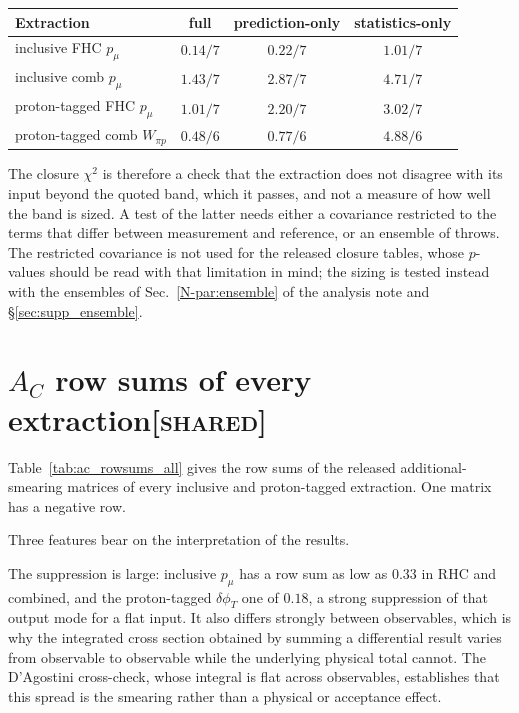 \documentclass[11pt,a4paper]{article}
\newcommand{\noteref}[2]{#1~\ref{N-#2} of the analysis note}
\newcommand{\scopetag}[1]{\hfill{\normalfont\small\textsc{[#1]}}}
\begin{document}
\begin{center}
\small
\begin{tabular}{lccc}
\toprule
Extraction & full & prediction-only & statistics-only \\
\midrule
inclusive FHC $p_\mu$        & $0.14/7$ & $0.22/7$ & $1.01/7$ \\
inclusive comb $p_\mu$       & $1.43/7$ & $2.87/7$ & $4.71/7$ \\
proton-tagged FHC $p_\mu$    & $1.01/7$ & $2.20/7$ & $3.02/7$ \\
proton-tagged comb $W_{\pi p}$ & $0.48/6$ & $0.77/6$ & $4.88/6$ \\
\bottomrule
\end{tabular}
\end{center}

The closure $\chi^2$ is therefore a check that the extraction does not disagree
with its input beyond the quoted band, which it passes, and not a measure of how well the
band is sized.  A test of the latter needs either a covariance restricted to the terms that differ
between measurement and reference, or an ensemble of throws. The restricted covariance is
not used for the released closure tables, whose $p$-values should be read with that
limitation in mind; the sizing is tested instead with the ensembles of
\noteref{Sec.}{par:ensemble} and \S\ref{sec:supp_ensemble}.

\section[$A_C$ row sums of every extraction]{$A_C$ row sums of every extraction\scopetag{shared}}
\label{sec:supp_ac}

Table~\ref{tab:ac_rowsums_all} gives the row sums of the released additional-smearing
matrices of every inclusive and proton-tagged extraction. One matrix has a negative row.



Three features bear on the interpretation of the results.

The suppression is large: inclusive $p_\mu$ has a row sum as low as $0.33$ in
RHC and combined, and the proton-tagged $\delta\phi_T$ one of $0.18$, a strong suppression of that output mode
for a flat input.  It also differs strongly between observables, which is
why the integrated cross section obtained by summing a differential result
varies from observable to observable while the underlying physical total cannot.  The
D'Agostini cross-check, whose integral is flat across observables, establishes
that this spread is the smearing rather than a physical or acceptance effect.
\end{document}
